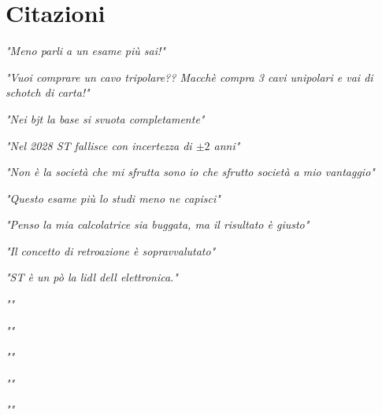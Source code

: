 \chapter{Citazioni}

\raggedright
{\itshape "Meno parli a un esame più sai!"}
\raggedleft

\vspace{5mm}

\raggedleft
{\itshape "Vuoi comprare un cavo tripolare?? Macchè compra 3 cavi unipolari e vai di schotch di carta!"}
\raggedright

\vspace{5mm}

\raggedright
{\itshape "Nei bjt la base si svuota completamente"}
\raggedleft

\vspace{5mm}

\raggedleft
{\itshape "Nel 2028 ST fallisce con incertezza di $\pm 2$ anni"}
\raggedright

\vspace{5mm}

\raggedright
{\itshape "Non è la società che mi sfrutta sono io che sfrutto società a mio vantaggio"}
\raggedleft

\vspace{5mm}

\raggedleft
{\itshape "Questo esame più lo studi meno ne capisci"}
\raggedright

\vspace{5mm}

\raggedright
{\itshape "Penso la mia calcolatrice sia buggata, ma il risultato è giusto"}
\raggedleft

\vspace{5mm}

\raggedleft
{\itshape "Il concetto di retroazione è sopravvalutato"}
\raggedright

\vspace{5mm}

\raggedright
{\itshape "ST è un pò la lidl dell elettronica."}
\raggedleft

\vspace{5mm}

\raggedleft
{\itshape ""}
\raggedright

\vspace{5mm}

\raggedright
{\itshape ""}
\raggedleft

\vspace{5mm}

\raggedleft
{\itshape ""}
\raggedright

\vspace{5mm}

\raggedright
{\itshape ""}
\raggedleft

\vspace{5mm}

\raggedleft
{\itshape ""}
\raggedright
